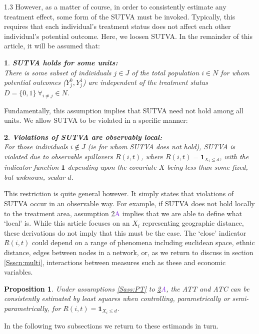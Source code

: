 \documentclass{article}
\makeatletter
\newtheorem{proposition}{Proposition}
\newtheorem*{assumption*}{\assumptionnumber}
\providecommand{\assumptionnumber}{}
\newenvironment{assumption}[2]
 {%
  \renewcommand{\assumptionnumber}{Assumption #1{#2}}%
  \begin{assumption*}%
  \protected@edef\@currentlabel{#1}%
 }
 {%
  \end{assumption*}
 }
\newcommand{\asref}[2]{\ref{#1}{\textcolor{BlueViolet}{#2}}}
\makeatother
\begin{document}
\begin{spacing}{1.3}
However, as a matter of course, in order to consistently estimate any
treatment effect, some form of the SUTVA must be invoked.  Typically,
this requires that each individual's treatment status does not affect
each other individual's potential outcome.  Here, we loosen SUTVA. 
In the remainder of this article, it will be assumed that:
\begin{assumption}{3}{}
\label{Sass:SUTVAs}
\textbf{SUTVA holds for some units:} \\
There is some subset of individuals $j\in J$ of the total population $i\in N$ 
for whom potential outcomes ($Y_j^0, Y_j^1$) are independent of the treatment 
status $D=\{0,1\}\ \forall_{i\neq j} \in N$.
\end{assumption}
\noindent Fundamentally, this assumption implies that SUTVA need not hold among 
all units.  We allow SUTVA to be violated in a specific manner:
\begin{assumption}{4}{A}
\label{Sass:SUTVAl}
\textbf{Violations of SUTVA are observably local:} \\ 
For those individuals $i\notin J$ (ie for whom SUTVA does not hold), SUTVA is
violated due to observable spillovers $R(i,t)$, where 
$R(i,t)=\mathbf{1}_{X_i\leq d}$, with the indicator function $\mathbf{1}$
depending upon the covariate $X$ being less than some fixed, but unknown, 
scalar $d$.
\end{assumption}
\vspace{-4mm}
\noindent This restriction is quite general however.  It simply states that
violations of SUTVA occur in an observable way.  For example, if SUTVA does
not hold locally to the treatment area, assumption \asref{Sass:SUTVAl}{A} implies
that we are able to define what `local' is.  While this article focuses on
an $X_i$ representing geographic distance, these derivations do not imply that 
this must be the case.  The `close' indicator $R(i,t)$ could depend on a range 
of phenomena including euclidean space, ethnic distance, edges between
nodes in a network, or, as we return to discuss in section
\ref{Ssscn:multi}, interactions between measures such as  these and
economic variables. 
\begin{proposition}
\label{Pass:ATT}
Under assumptions \ref{Sass:PT} to \asref{Sass:SUTVAl}{A}, the ATT and ATC can be 
consistently estimated by least squares when controlling, parametrically or
semi-parametrically, for $R(i,t)=\mathbf{1}_{X_i\leq d}$.
\end{proposition}
\noindent In the following two subsections we return to these estimands in turn. 


\end{spacing}
\end{document}
